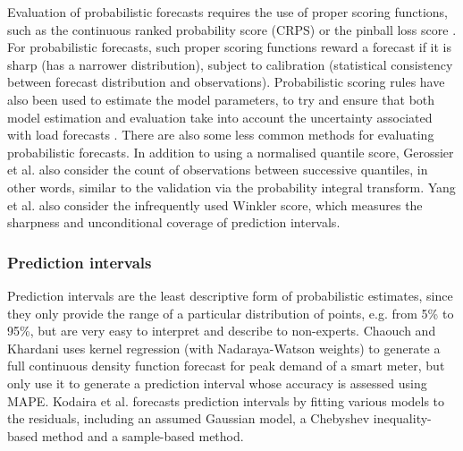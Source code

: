 Evaluation of probabilistic forecasts requires the use of proper scoring functions, such as the continuous ranked probability score (CRPS) \cite{taieb2016fui} or the pinball loss score \cite{wang2019pil}. For probabilistic forecasts, such proper scoring functions reward a forecast if it is sharp (has a narrower distribution), subject to calibration (statistical consistency between forecast distribution and observations). Probabilistic scoring rules have also been used to estimate the model parameters, to try and ensure that both model estimation and evaluation take into account the uncertainty associated with load forecasts \cite{Arora2016fes}. There are also some less common methods for evaluating probabilistic forecasts. In addition to using a normalised quantile score, Gerossier et al. \cite{gerossier2018rda} also consider the count of observations between successive quantiles, in other words, similar to the validation via the probability integral transform. Yang et al. \cite{yang2020bdl} also consider the infrequently used Winkler score, which measures the sharpness and unconditional coverage of prediction intervals. 
\subsubsection{Prediction intervals}
Prediction intervals are the least descriptive form of probabilistic estimates, since they only provide the range of a particular distribution of points, e.g. from 5\% to 95\%, but are very easy to interpret and describe to non-experts. Chaouch and  Khardani \cite{chaouch2015rcq} uses kernel regression (with Nadaraya-Watson weights) to generate a full continuous density function forecast for peak demand of a smart meter, but only use it to generate a prediction interval whose accuracy is assessed using MAPE.  Kodaira et al.\cite{kodaira2020oes} forecasts prediction intervals by fitting various models to the residuals, including an assumed Gaussian model, a Chebyshev inequality-based method and a sample-based method.

